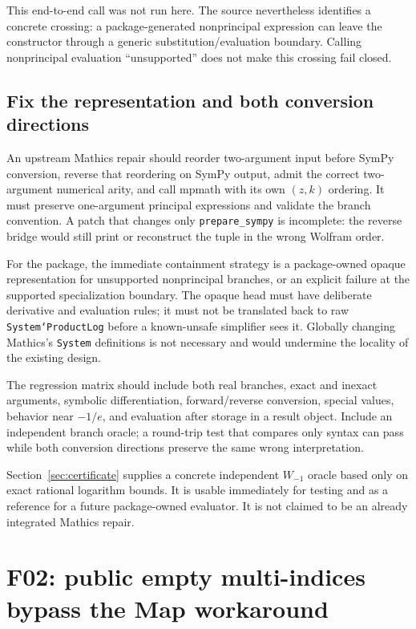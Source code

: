 \documentclass[11pt,letterpaper]{article}
\newcommand{\code}[1]{\texttt{#1}}
\begin{document}
This end-to-end call was not run here. The source nevertheless identifies a concrete crossing: a package-generated nonprincipal expression can leave the constructor through a generic substitution/evaluation boundary. Calling nonprincipal evaluation ``unsupported'' does not make this crossing fail closed.

\subsection{Fix the representation and both conversion directions}

An upstream Mathics repair should reorder two-argument input before SymPy conversion, reverse that reordering on SymPy output, admit the correct two-argument numerical arity, and call mpmath with its own $(z,k)$ ordering. It must preserve one-argument principal expressions and validate the branch convention. A patch that changes only \code{prepare\_sympy} is incomplete: the reverse bridge would still print or reconstruct the tuple in the wrong Wolfram order.

For the package, the immediate containment strategy is a package-owned opaque representation for unsupported nonprincipal branches, or an explicit failure at the supported specialization boundary. The opaque head must have deliberate derivative and evaluation rules; it must not be translated back to raw \code{System`ProductLog} before a known-unsafe simplifier sees it. Globally changing Mathics's \code{System} definitions is not necessary and would undermine the locality of the existing design.

The regression matrix should include both real branches, exact and inexact arguments, symbolic differentiation, forward/reverse conversion, special values, behavior near $-1/e$, and evaluation after storage in a result object. Include an independent branch oracle; a round-trip test that compares only syntax can pass while both conversion directions preserve the same wrong interpretation.

Section~\ref{sec:certificate} supplies a concrete independent $W_{-1}$ oracle based only on exact rational logarithm bounds. It is usable immediately for testing and as a reference for a future package-owned evaluator. It is not claimed to be an already integrated Mathics repair.

\section{F02: public empty multi-indices bypass the Map workaround}
\label{sec:f02}
\end{document}
